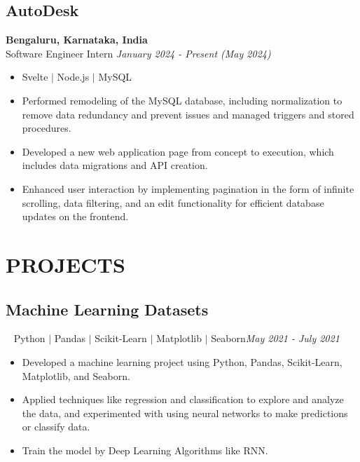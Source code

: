 \documentclass[12pt]{article}
\begin{document}
\subsection*{AutoDesk} \hfill \textbf{Bengaluru, Karnataka, India} \\
Software Engineer Intern  \hfill \textit{January 2024 - Present (May 2024)} \\
\begin{itemize}[leftmargin=16pt, topsep=1pt, itemsep=1.5pt, partopsep=0pt, parsep=1pt] 
\item Svelte $|$ Node.js $|$ MySQL 
\item Performed remodeling of the MySQL database, including normalization to remove data redundancy and prevent issues and managed triggers and stored procedures.
\item Developed a new web application page from concept to execution, which includes data migrations and API creation.
\item Enhanced user interaction by implementing pagination in the form of infinite scrolling, data filtering, and an edit functionality for efficient database updates on the frontend.
\end{itemize}

\section*{PROJECTS}
\subsection*{Machine Learning Datasets}~ Python $\vert$ Pandas $\vert$ Scikit-Learn $\vert$ Matplotlib $\vert$ Seaborn\hfill \textit{May 2021 - July 2021} \\
\begin{itemize}[leftmargin=*,topsep=0pt,itemsep=1pt,partopsep=1pt, parsep=1pt]
\item Developed a machine learning project using Python, Pandas, Scikit-Learn, Matplotlib, and Seaborn.
\item Applied techniques like regression and classification to explore and analyze the data, and experimented with using neural networks to make predictions or classify data.
    \item Train the model by Deep Learning Algorithms like RNN.
\end{itemize}
\end{document}
